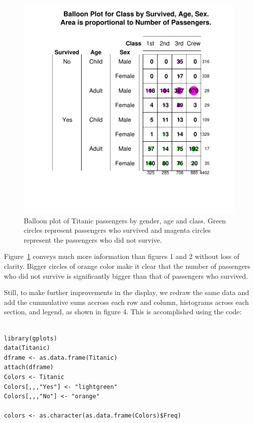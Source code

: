 \documentclass[a4paper]{report}
\begin{document}
\begin{article}
\begin{figure}
\includegraphics[width=\textwidth]{Figure3.pdf}
\caption{\label{figure:Figure3}
  Balloon plot of Titanic passengers by gender, age and class. Green
  circles represent passengers who survived and magenta circles
  represent the passengers who did not survive.}
\end{figure}

Figure~\ref{figure:Figure3} conveys much more information than
figures 1 and 2 without loss of clarity. Bigger circles of orange
color make it clear that the number of passengers who did not
survive is significantly bigger than that of passengers who
survived.


Still, to make further improvements in the display, we redraw the
same data and add the cummulative sums accross each row and column,
 histograms across each section, and legend, as shown in figure 4.
  This is accomplished using the code:

{
\small
\begin{verbatim}

library(gplots)
data(Titanic)
dframe <- as.data.frame(Titanic) 
attach(dframe)
Colors <- Titanic
Colors[,,,"Yes"] <- "lightgreen"
Colors[,,,"No"] <- "orange"

colors <- as.character(as.data.frame(Colors)$Freq)


\end{verbatim}}
\end{article}
\end{document}
